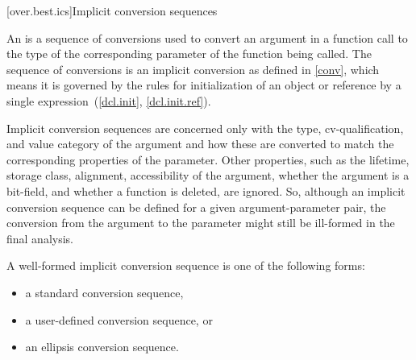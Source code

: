 [over.best.ics]{Implicit conversion sequences}%

\pnum
An 
is a sequence of conversions used
to convert an argument in a function call to the type of the
corresponding parameter of the function being called.
The
sequence of conversions is an implicit conversion as defined in
\ref{conv}, which means it is governed by the rules for
initialization of an object or reference by a single
expression~(\ref{dcl.init}, \ref{dcl.init.ref}).

\pnum
Implicit conversion sequences are concerned only with the type,
cv-qualification, and value category of the argument and how these
are converted to match the corresponding properties of the
parameter.
Other properties, such as the lifetime, storage class,
alignment, accessibility of the argument, whether the argument is a bit-field,
and whether a function is deleted, are ignored.
So, although an implicit
conversion sequence can be defined for a given argument-parameter
pair, the conversion from the argument to the parameter might still
be ill-formed in the final analysis.

\pnum
A
well-formed implicit conversion
sequence is one of the following forms:

\begin{itemize}
\item
a standard conversion sequence,
\item
a user-defined conversion sequence, or
\item
an ellipsis conversion sequence.
\end{itemize}

